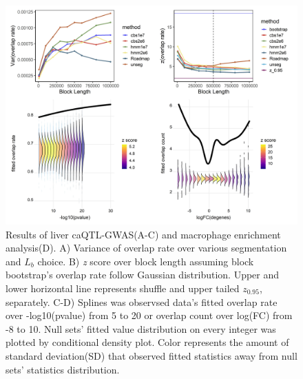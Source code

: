 
\begin{figure}[hbtp]
\centering%
\setlength{\abovecaptionskip}{-0.1cm}
\setlength{\belowcaptionskip}{-0.1cm}
\includegraphics[scale=0.25]{Figures/fig2.jpeg}
\caption{Results of liver caQTL-GWAS(A-C) and macrophage enrichment analysis(D). A) Variance of overlap rate over various segmentation and $L_b$ choice. B) {\it z} score over block length assuming block bootstrap's overlap rate follow Gaussian distribution. Upper and lower horizontal line represents shuffle and upper tailed $z_{0.95}$, separately. C-D) Splines was observsed data's fitted overlap rate over -log10(pvalue) from 5 to 20 or overlap count over log(FC) from -8 to 10. Null sets' fitted value distribution on every integer was plotted by conditional density plot. Color represents the amount of standard deviation(SD) that observed fitted statistics away from null sets' statistics distribution. }
\label{fig:result}
\vspace{-1.2cm}
\end{figure}

